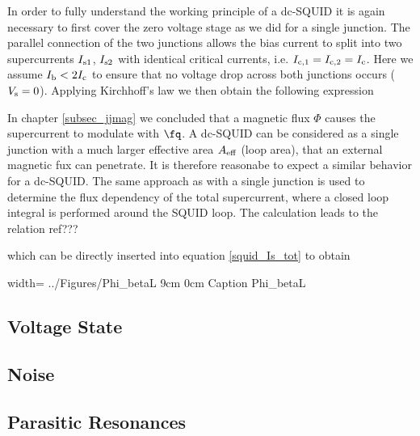 In order to fully understand the working principle of a dc-SQUID it is again necessary to first cover the zero voltage stage as we did for a single junction. 
The parallel connection of the two junctions allows the bias current to split into two supercurrents $I_{\rm s1}$, $I_{\rm s2}$ with identical critical currents, i.e. $I_{\rm c,1}=I_{\rm c,2}=I_{\rm c}$. Here we assume $I_{\rm b}<2I_{\rm c}$ to ensure that no voltage drop across both junctions occurs ($V_{\rm s}=0$). Applying Kirchhoff's law we then obtain the following expression 


In chapter \ref{subsec_jjmag} we concluded that a magnetic flux $\Phi$ causes the supercurrent to modulate with $\unit{\fq}$. A dc-SQUID can be considered as a single junction with a much larger effective area $A_{\rm eff}$ (loop area), that an external magnetic fux can penetrate. It is therefore reasonabe to expect a similar behavior for a dc-SQUID. The same approach as with a single junction is used to determine the flux dependency of the total supercurrent, where a closed loop integral is performed around the SQUID loop. The calculation leads to the relation ref???  


which can be directly inserted into equation \ref{squid_Is_tot} to obtain







{width=\textwidth}
{../Figures/Phi_betaL}
{9cm}
{0cm}
{Caption} 
{Phi_betaL}

\subsection{Voltage State}

\subsection{Noise}

\subsection{Parasitic Resonances}



